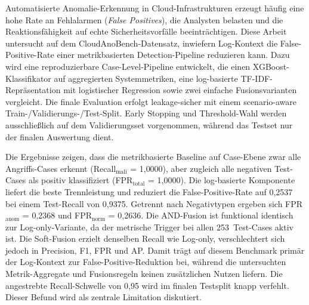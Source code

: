 \documentclass[serif,article,parskip,de]{agse-thesis}
\begin{document}
{ %
    \setlength{\parindent}{0pt}%
    \setlength{\parskip}{0.55\baselineskip plus 0.1\baselineskip minus 0.05\baselineskip}%
    \noindent
    Automatisierte Anomalie-Erkennung in Cloud-Infrastrukturen erzeugt häufig eine
    hohe Rate an Fehlalarmen (\emph{False Positives}), die Analysten belasten und
    die Reaktions\-fähigkeit auf echte Sicherheitsvorfälle beeinträchtigen. Diese Arbeit
    untersucht auf dem CloudAnoBench-Datensatz, inwiefern Log-Kontext die
    False-Positive-Rate einer metrikbasierten Detection-Pipeline reduzieren kann. Dazu wird
    eine reproduzierbare Case-Level-Pipeline entwickelt, die einen XGBoost-Klassifikator
    auf aggregierten Systemmetriken, eine log-basierte TF-IDF-Reprä\-sentation mit
    logistischer Regression sowie zwei einfache Fusionsvarianten vergleicht.
    Die finale Evaluation erfolgt leakage-sicher mit einem scenario-aware
    Train-/Validierungs-/Test-Split. Early Stopping und Threshold-Wahl werden ausschließlich
    auf dem Validierungsset vorgenommen, während das Testset nur der finalen Auswertung dient.

    Die Ergebnisse zeigen, dass die metrikbasierte Baseline auf Case-Ebene zwar
    alle Angriffs-Cases erkennt (Recall$_\text{mali}$ = 1{,}0000), aber zugleich alle
    negativen Test-Cases als positiv klassifiziert
    (FPR$_\text{total}$ = 1{,}0000). Die log-basierte Komponente liefert die beste
    Trennleistung und reduziert die False-Positive-Rate auf 0{,}2537 bei einem
    Test-Recall von 0{,}9375. Getrennt nach Negativtypen ergeben sich
    FPR$_\text{anom}$ = 0{,}2368 und FPR$_\text{norm}$ = 0{,}2636. Die AND-Fusion
    ist funktional identisch zur Log-only-Variante, da der metrische Trigger bei allen
    253~Test-Cases aktiv ist. Die Soft-Fusion erzielt denselben Recall wie Log-only,
    verschlechtert sich jedoch in Precision, F1, FPR und AP. Damit trägt auf diesem Benchmark primär der Log-Kontext zur
    False-Positive-Reduktion bei, während die untersuchten Metrik-Aggregate und
    Fusionsregeln keinen zusätzlichen Nutzen liefern. Die angestrebte Recall-Schwelle
    von 0{,}95 wird im finalen Testsplit knapp verfehlt. Dieser Befund wird als zentrale
    Limitation diskutiert.
}



\clearpage

\tableofcontents
\end{document}
